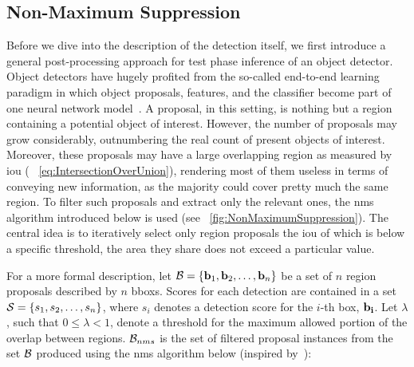 \subsection{Non-Maximum Suppression}
\label{ssec:NonMaximumSuppression}

Before we dive into the description of the detection itself, we first introduce a general post-processing approach for test phase inference of an object detector. Object detectors have hugely profited from the so-called end-to-end learning paradigm in which object proposals, features, and the classifier become part of one neural network model~\cite{hosang2017learningnms}. A proposal, in this setting, is nothing but a region containing a potential object of interest. However, the number of proposals may grow considerably, outnumbering the real count of present objects of interest. Moreover, these proposals may have a large overlapping region as measured by \gls{iou} ( \sectiontext{}~\ref{eq:IntersectionOverUnion}), rendering most of them useless in terms of conveying new information, as the majority could cover pretty much the same region. To filter such proposals and extract only the relevant ones, the \gls{nms} algorithm introduced below is used (see \figtext{}~\ref{fig:NonMaximumSuppression}). The central idea is to iteratively select only region proposals the \gls{iou} of which is below a specific threshold, \ietext{} the area they share does not exceed a particular value.

For a more formal description, let $\mathcal{B} = \left\{ {\mathbf{b}_1, \mathbf{b}_2, \dots, \mathbf{b}_n} \right\}$ be a set of $n$ region proposals described by $n$ \glspl{bbox}. Scores for each detection are contained in a set $\mathcal{S} = \left\{ {s_1, s_2, \dots, s_n} \right\}$, where $s_i$ denotes a detection score for the $i$-th box, $\mathbf{b_i}$. Let $\lambda$, such that $0 \leq \lambda < 1$, denote a threshold for the maximum allowed portion of the overlap between regions. $\mathcal{B}_{nms}$ is the set of filtered proposal instances from the set $\mathcal{B}$ produced using the \gls{nms} algorithm below (inspired by~\cite{bodla2017softnms}):

